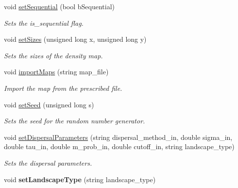 \begin{DoxyCompactItemize}
\item 
void \hyperlink{class_simulate_dispersal_a3da09319132db8c7ad035290be6590ef}{set\+Sequential} (bool b\+Sequential)
\begin{DoxyCompactList}\small\item\em Sets the is\+\_\+sequential flag. \end{DoxyCompactList}\item 
void \hyperlink{class_simulate_dispersal_ade30de5c9c7daebb6ccc4168fec3e813}{set\+Sizes} (unsigned long x, unsigned long y)
\begin{DoxyCompactList}\small\item\em Sets the sizes of the density map. \end{DoxyCompactList}\item 
void \hyperlink{class_simulate_dispersal_a8c7c65b4788010f02213fba5c985f49a}{import\+Maps} (string map\+\_\+file)
\begin{DoxyCompactList}\small\item\em Import the map from the prescribed file. \end{DoxyCompactList}\item 
void \hyperlink{class_simulate_dispersal_a46f2cd557ac9b21c107eac75e7c916af}{set\+Seed} (unsigned long s)
\begin{DoxyCompactList}\small\item\em Sets the seed for the random number generator. \end{DoxyCompactList}\item 
void \hyperlink{class_simulate_dispersal_a93b3d450679b00c015f5e18d91f3a426}{set\+Dispersal\+Parameters} (string dispersal\+\_\+method\+\_\+in, double sigma\+\_\+in, double tau\+\_\+in, double m\+\_\+prob\+\_\+in, double cutoff\+\_\+in, string landscape\+\_\+type)
\begin{DoxyCompactList}\small\item\em Sets the dispersal parameters. \end{DoxyCompactList}\item 
void {\bfseries set\+Landscape\+Type} (string landscape\+\_\+type)\hypertarget{class_simulate_dispersal_a627bcb0be7e7d6b0ef1dbd44b32a1909}{}\label{class_simulate_dispersal_a627bcb0be7e7d6b0ef1dbd44b32a1909}


\end{DoxyCompactItemize}
